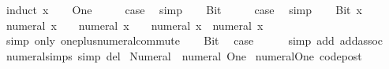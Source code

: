 \begin{isabellebody}
%
\isadelimproof
%
\endisadelimproof
%
\isatagproof
{}\isamarkupfalse%
\ {\isacharparenleft}{\kern0pt}induct\ x{\isacharparenright}{\kern0pt}\isanewline
\ \ \isamarkupfalse%
\ One\isanewline
\ \ \isamarkupfalse%
\ \isamarkupfalse%
\ {\isacharquery}{\kern0pt}case\ \isamarkupfalse%
\ simp\isanewline
{}\isamarkupfalse%
\isanewline
\ \ \isamarkupfalse%
\ Bit{}\isanewline
\ \ \isamarkupfalse%
\ \isamarkupfalse%
\ {\isacharquery}{\kern0pt}case\ \isamarkupfalse%
\ simp\isanewline
{}\isamarkupfalse%
\isanewline
\ \ \isamarkupfalse%
\ {\isacharparenleft}{\kern0pt}Bit{}\ x{\isacharparenright}{\kern0pt}\isanewline
\ \ \isamarkupfalse%
\ {\isachardoublequoteopen}numeral\ x\ {\isacharplus}{\kern0pt}\ {\isacharparenleft}{\kern0pt}{}\ {\isacharplus}{\kern0pt}\ numeral\ x{\isacharparenright}{\kern0pt}\ {\isacharplus}{\kern0pt}\ {}\ {\isacharequal}{\kern0pt}\ numeral\ x\ {\isacharplus}{\kern0pt}\ {\isacharparenleft}{\kern0pt}numeral\ x\ {\isacharplus}{\kern0pt}\ {}{\isacharparenright}{\kern0pt}\ {\isacharplus}{\kern0pt}\ {}{\isachardoublequoteclose}\isanewline
\ \ \ \ \isamarkupfalse%
\ {\isacharparenleft}{\kern0pt}simp\ only{\isacharcolon}{\kern0pt}\ one{\isacharunderscore}{\kern0pt}plus{\isacharunderscore}{\kern0pt}numeral{\isacharunderscore}{\kern0pt}commute{\isacharparenright}{\kern0pt}\isanewline
\ \ \isamarkupfalse%
\ Bit{}\ \isamarkupfalse%
\ {\isacharquery}{\kern0pt}case\isanewline
\ \ \ \ \isamarkupfalse%
\ {\isacharparenleft}{\kern0pt}simp\ add{\isacharcolon}{\kern0pt}\ add{\isachardot}{\kern0pt}assoc{\isacharparenright}{\kern0pt}\isanewline
{}\isamarkupfalse%
%
\endisatagproof
{\isafoldproof}%
%
\isadelimproof
\isanewline
%
\endisadelimproof
\isanewline
{}\isamarkupfalse%
\ numeral{\isachardot}{\kern0pt}simps\ {\isacharbrackleft}{\kern0pt}simp\ del{\isacharbrackright}{\kern0pt}\isanewline
\isanewline
{}\isamarkupfalse%
\ {\isachardoublequoteopen}Numeral{}\ {\isasymequiv}\ numeral\ One{\isachardoublequoteclose}\isanewline
\isanewline
{}\isamarkupfalse%
\ numeral{\isacharunderscore}{\kern0pt}One\ {\isacharbrackleft}{\kern0pt}code{\isacharunderscore}{\kern0pt}post{\isacharbrackright}{\kern0pt}\isanewline
\isanewline
{}\isamarkupfalse%

\end{isabellebody}
